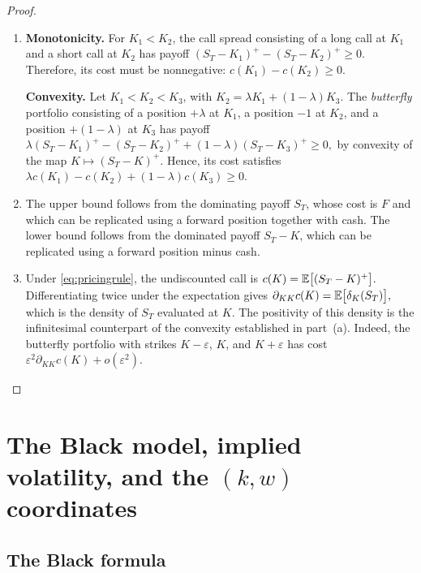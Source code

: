 \begin{proof}
\begin{enumerate}[label=\textup{(\alph*)}, leftmargin=*]

\item \textbf{Monotonicity.}
For $K_1<K_2$, the call spread consisting of a long call at $K_1$ and a short call at $K_2$
has payoff $(S_T-K_1)^+-(S_T-K_2)^+\ge 0.$
Therefore, its cost must be nonnegative: $c(K_1)-c(K_2)\ge 0.$

\medskip

\textbf{Convexity.} Let $K_1<K_2<K_3$, with $K_2=\lambda K_1+(1-\lambda)K_3.$
The \emph{butterfly} portfolio consisting of a position $+\lambda$ at $K_1$, a position $-1$
at $K_2$, and a position $+(1-\lambda)$ at $K_3$ has payoff
$\lambda(S_T-K_1)^+-(S_T-K_2)^+ +(1-\lambda)(S_T-K_3)^+\ge 0,$
by convexity of the map $K\mapsto (S_T-K)^+$. Hence, its cost satisfies
$\lambda c(K_1)-c(K_2)+(1-\lambda)c(K_3)\ge 0.$

\medskip

\item The upper bound follows from the dominating payoff $S_T$, whose cost is $F$ and which
can be replicated using a forward position together with cash. The lower bound follows from
the dominated payoff $S_T-K$, which can be replicated using a forward position minus cash.

\medskip

\item Under \eqref{eq:pricingrule}, the undiscounted call is $c(K)=\mathbb{E}\bigl[(S_T-K)^+\bigr].$
Differentiating twice under the expectation gives $\partial_{KK}c(K)=\mathbb{E}\bigl[\delta_K(S_T)\bigr],$
which is the density of $S_T$ evaluated at $K$. The positivity of this density is the
infinitesimal counterpart of the convexity established in part~(a). Indeed, the butterfly
portfolio with strikes $K-\varepsilon$, $K$, and $K+\varepsilon$ has cost
$\varepsilon^2\partial_{KK}c(K)+o(\varepsilon^2).$

\end{enumerate}
\end{proof}
\section{The Black model, implied volatility, and the $(k,w)$ coordinates}\label{sec:blacksec}

\subsection{The Black formula}

